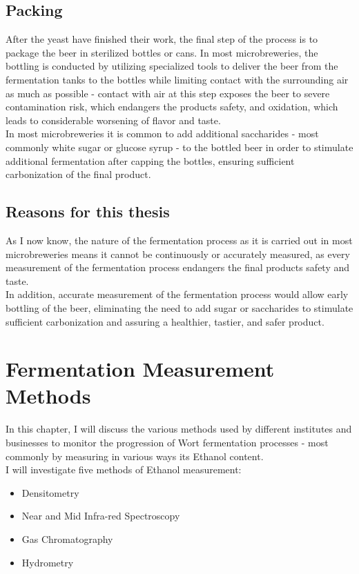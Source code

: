 \documentclass[twoside]{ctuthesis}
\theoremstyle{plain}
\theoremstyle{definition}
\theoremstyle{note}
\begin{document}
\section{Packing}
After the yeast have finished their work, the final step of the process is to package the beer in sterilized bottles or cans. In most microbreweries, the bottling is conducted by utilizing specialized tools to deliver the beer from the fermentation tanks to the bottles while limiting contact with the surrounding air as much as possible - contact with air at this step exposes the beer to severe contamination risk,  which endangers the products safety, and oxidation, which leads to considerable worsening of flavor and taste.\\
In most microbreweries it is common to add additional saccharides - most commonly white sugar or glucose syrup - to the bottled beer in order to stimulate additional fermentation after capping the bottles, ensuring sufficient carbonization of the final product.

\section{Reasons for this thesis}
As I now know, the nature of the fermentation process as it is carried out in most microbreweries means it cannot be continuously or accurately measured, as every measurement of the fermentation process endangers the final products safety and taste.\\
In addition, accurate measurement of the fermentation process would allow early bottling of the beer, eliminating the need to add sugar or saccharides to stimulate sufficient carbonization and assuring a healthier, tastier, and safer product.

\chapter{Fermentation Measurement Methods}
In this chapter, I will discuss the various methods used by different institutes and businesses to monitor the progression of Wort fermentation processes - most commonly by measuring in various ways its Ethanol content.\\
I will investigate five methods of Ethanol measurement:\\

\begin{itemize}
	\item Densitometry
	\item Near and Mid Infra-red Spectroscopy
	\item Gas Chromatography
	\item Hydrometry
\end{itemize}
\end{document}
